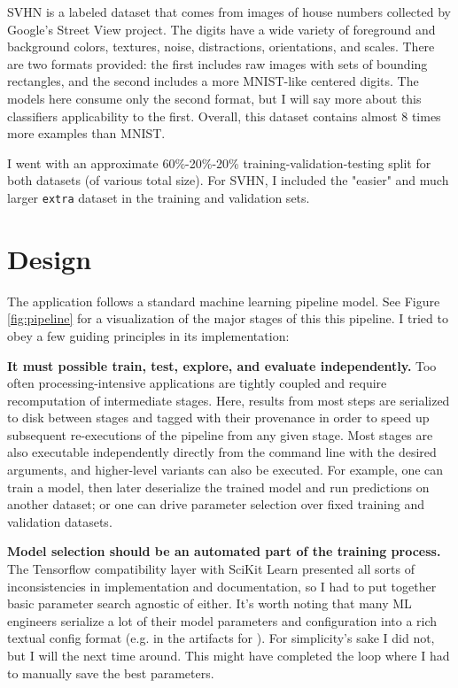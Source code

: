 \documentclass{article}
\begin{document}
SVHN is a labeled dataset that comes from images of house numbers collected by Google's Street View project. The digits have a wide variety of foreground and background colors, textures, noise, distractions, orientations, and scales. There are two formats provided: the first includes raw images with sets of bounding rectangles, and the second includes a more MNIST-like centered digits. The models here consume only the second format, but I will say more about this classifiers applicability to the first. Overall, this dataset contains almost 8 times more examples than MNIST.

I went with an approximate 60\%-20\%-20\% training-validation-testing split for both datasets (of various total size). For SVHN, I included the "easier" and much larger \texttt{extra} dataset in the training and validation sets.

\section{Design}

The application follows a standard machine learning pipeline model. See Figure \ref{fig:pipeline} for a visualization of the major stages of this this pipeline. I tried to obey a few guiding principles in its implementation: 

\textbf{It must possible train, test, explore, and evaluate independently.} Too often processing-intensive applications are tightly coupled and require recomputation of intermediate stages. Here, results from most steps are serialized to disk between stages and tagged with their provenance in order to speed up subsequent re-executions of the pipeline from any given stage. Most stages are also executable independently directly from the command line with the desired arguments, and higher-level variants can also be executed.  For example, one can train a model, then later deserialize the trained model and run predictions on another dataset; or one can drive parameter selection over fixed training and validation datasets.

\textbf{Model selection should be an automated part of the training process.} The Tensorflow \cite{tensorflow2015-whitepaper} compatibility layer with SciKit Learn \cite{scikit-learn} presented all sorts of inconsistencies in implementation and documentation, so I had to put together basic parameter search agnostic of either. It's worth noting that many ML engineers serialize a lot of their model parameters and configuration into a rich textual config format (e.g. in the artifacts for \cite{krizhevsky2012imagenet}). For simplicity's sake I did not, but I will the next time around. This might have completed the loop where I had to manually save the best parameters.
\end{document}
